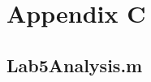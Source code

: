 \chapter{Appendix C}
\section{Lab5Analysis.m} \label{sec:code}

\inputminted{matlab}{Code/Lab5Analysis.m}\label{listing:data_analysis_script}